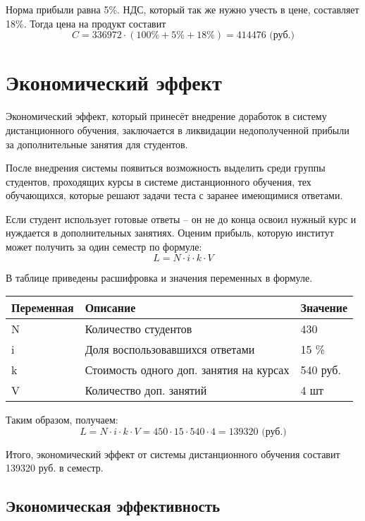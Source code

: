 Норма прибыли равна 5\%. НДС, который так же нужно учесть в цене, составляет 18\%. Тогда цена на продукт составит
$$
C = 336972 \cdot (100\% + 5\% + 18\%) = 414476 \mbox{ (руб.)}
$$

\section{Экономический эффект}

Экономический эффект, который принесёт внедрение доработок в систему дистанционного обучения, заключается в ликвидации недополученной при\-были за дополнительные занятия для студентов.

После внедрения системы появиться возможность выделить среди группы студентов, проходящих курсы в системе дистанционного обучения, тех обу\-чающихся, которые решают задачи теста с заранее имеющимися ответами.

Если студент использует  готовые ответы – он не до конца освоил нужный курс и нуждается в дополнительных занятиях. Оценим прибыль, которую институт может получить за один семестр по формуле:
$$
L = N \cdot i \cdot k \cdot V
$$

В таблице приведены расшифровка и значения переменных в формуле.
\begin{table}[H]
\begin{center}
\begin{tabular}{|p{3.0cm}|p{4.1cm}|p{2.6cm}|}
\hline
Переменная&
Описание&
Значение\\
\hline
N&
Количество студентов &
430\\
\hline
i&
Доля воспользовавшихся ответами&
15 \%\\
\hline
k&
Стоимость одного доп. занятия на курсах&
540 руб.\\
\hline
V&
Количество доп. занятий&
4 шт
\\
\hline
\end{tabular}
\end{center}
\end{table}

Таким образом, получаем:
$$
L = N \cdot i \cdot k \cdot V = 450 \cdot 15 \cdot 540 \cdot 4 =  139320 \mbox{ (руб.)}
$$

Итого, экономический эффект от системы дистанционного обучения сос\-тавит 139320 руб. в семестр.

\subsection{Экономическая эффективность}

